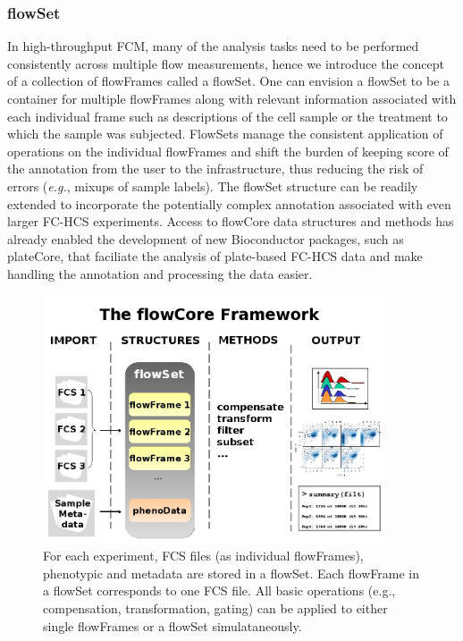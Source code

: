 \documentclass[12pt]{article}
\begin{document}
\subsubsection*{flowSet}
In high-throughput FCM, many of the analysis tasks need to be
performed consistently across multiple flow measurements, hence we
introduce the concept of a collection of flowFrames called a
flowSet. One can envision a flowSet to be a container for multiple
flowFrames along with relevant information associated with each
individual frame such as descriptions of the cell sample or the
treatment to which the sample was subjected. FlowSets manage the
consistent application of operations on the individual flowFrames and
shift the burden of keeping score of the annotation from the user to
the infrastructure, thus reducing the risk of errors (\textit{e.g.},
mixups of sample labels). The flowSet structure can be readily
extended to incorporate the potentially complex annotation associated
with even larger FC-HCS experiments. Access to flowCore data
structures and methods has already enabled the development of new
Bioconductor packages, such as plateCore, that faciliate the analysis
of plate-based FC-HCS data and make handling the annotation and
processing the data easier.


\begin{figure}
\centering
\includegraphics[width=0.9\textwidth]{Figure1-flowCoreFrameWork.jpg}
\caption{\label{fig1:FrameWork}{For each experiment, FCS files (as
    individual flowFrames), phenotypic and metadata are stored in a
    flowSet. Each flowFrame in a flowSet corresponds to one FCS
    file. All basic operations (e.g., compensation, transformation,
    gating) can be applied to either single flowFrames or a flowSet
    simulataneously.}}
\end{figure}
\end{document}
